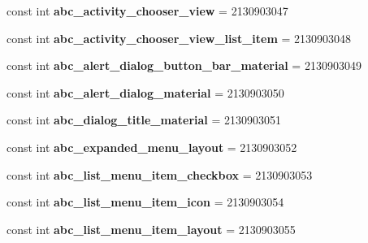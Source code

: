 \begin{DoxyCompactItemize}
\item 
\mbox{\label{classXaria_1_1Resource_1_1Layout_a67dd38a6bdca0bb8b8f713134f563e80}} 
const int {\bfseries abc\+\_\+activity\+\_\+chooser\+\_\+view} = 2130903047
\item 
\mbox{\label{classXaria_1_1Resource_1_1Layout_a1c5db0809fe2066a60aa0f6f70f1d312}} 
const int {\bfseries abc\+\_\+activity\+\_\+chooser\+\_\+view\+\_\+list\+\_\+item} = 2130903048
\item 
\mbox{\label{classXaria_1_1Resource_1_1Layout_a8fa56c0e4ed136690a49941ad1ed04f8}} 
const int {\bfseries abc\+\_\+alert\+\_\+dialog\+\_\+button\+\_\+bar\+\_\+material} = 2130903049
\item 
\mbox{\label{classXaria_1_1Resource_1_1Layout_a673c7ebc2c2be3a585963d6e90346a92}} 
const int {\bfseries abc\+\_\+alert\+\_\+dialog\+\_\+material} = 2130903050
\item 
\mbox{\label{classXaria_1_1Resource_1_1Layout_a53e665671cf71cf52c95ed8fbd9f5997}} 
const int {\bfseries abc\+\_\+dialog\+\_\+title\+\_\+material} = 2130903051
\item 
\mbox{\label{classXaria_1_1Resource_1_1Layout_a0fe21f392e27f6da9618adf3e7b50c4f}} 
const int {\bfseries abc\+\_\+expanded\+\_\+menu\+\_\+layout} = 2130903052
\item 
\mbox{\label{classXaria_1_1Resource_1_1Layout_a66f3829da33553b5292347115f39c732}} 
const int {\bfseries abc\+\_\+list\+\_\+menu\+\_\+item\+\_\+checkbox} = 2130903053
\item 
\mbox{\label{classXaria_1_1Resource_1_1Layout_aa3b10ae6e1915fe4a76d22d7f76c482d}} 
const int {\bfseries abc\+\_\+list\+\_\+menu\+\_\+item\+\_\+icon} = 2130903054
\item 
\mbox{\label{classXaria_1_1Resource_1_1Layout_a904e0a8001cc82cd602b20a72fabbaca}} 
const int {\bfseries abc\+\_\+list\+\_\+menu\+\_\+item\+\_\+layout} = 2130903055

\end{DoxyCompactItemize}
